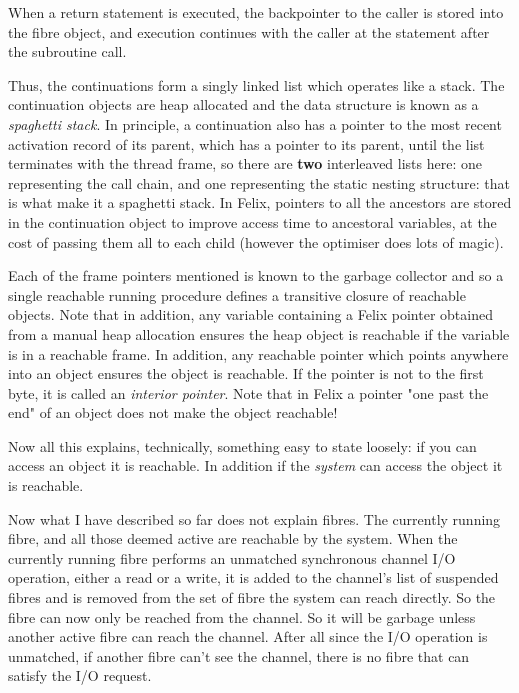 \documentclass[oneside]{book}
\begin{document}
When a return statement is executed, the backpointer to the
caller is stored into the fibre object, and execution continues
with the caller at the statement after the subroutine call.

Thus, the continuations form a singly linked list which operates
like a stack. The continuation objects are heap allocated and
the data structure is known as a {\em spaghetti stack}.
In principle, a continuation also has a pointer to the most recent
activation record of its parent, which has a pointer to its 
parent, until the list terminates with the thread frame,
so there are {\bf two} interleaved lists here: one representing
the call chain, and one representing the static nesting structure:
that is what make it a spaghetti stack. In Felix, pointers to all
the ancestors are stored in the continuation object to improve
access time to ancestoral variables, at the cost of passing them
all to each child (however the optimiser does lots of magic).

Each of the frame pointers mentioned is known to the garbage collector
and so a single reachable running procedure defines a transitive
closure of reachable objects. Note that in addition, any variable
containing a Felix pointer obtained from a manual heap allocation
ensures the heap object is reachable if the variable is in a 
reachable frame. In addition, any reachable pointer which points
anywhere into an object ensures the object is reachable.
If the pointer is not to the first byte, it is called
an {\em interior pointer}. Note that in Felix a pointer
"one past the end" of an object does not make the object
reachable!

Now all this explains, technically, something easy to state
loosely: if you can access an object it is reachable.
In addition if the {\em system} can access the object it
is reachable.

Now what I have described so far does not explain fibres.
The currently running fibre, and all those deemed active
are reachable by the system. When the currently running fibre
performs an unmatched synchronous channel I/O operation,
either a read or a write, it is added to the channel's
list of suspended fibres and is removed from the set of
fibre the system can reach directly. So the fibre can now
only be reached from the channel. So it will be garbage
unless another active fibre can reach the channel.
After all since the I/O operation is unmatched, if another
fibre can't see the channel, there is no fibre that
can satisfy the I/O request.
\end{document}
